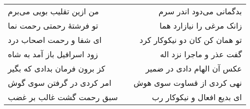 \begin{center}
\begin{longtable}{l p{0.5cm} r}
من ازین تقلیب بویی می‌برم
&&
بدگمانی می‌دود اندر سرم
\\
تو فرشتهٔ رحمتی رحمت نما
&&
زانک مرغی را نیازارد هما
\\
ای شفا و رحمت اصحاب درد
&&
تو همان کن کان دو نیکوکار کرد
\\
زود اسرافیل باز آمد به شاه
&&
گفت عذر و ماجرا نزد اله
\\
کز برون فرمان بدادی که بگیر
&&
عکس آن الهام دادی در ضمیر
\\
امر کردی در گرفتن سوی گوش
&&
نهی کردی از قساوت سوی هوش
\\
سبق رحمت گشت غالب بر غضب
&&
ای بدیع افعال و نیکوکار رب
\\
\end{longtable}
\end{center}
